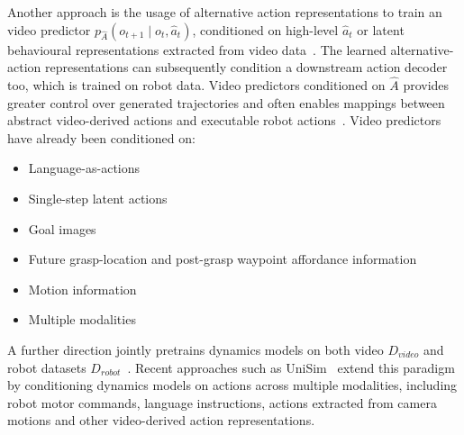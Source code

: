 Another approach is the usage of alternative action representations to train an video predictor $p_{\hat{A}}(o_{t+1} \mid o_t, \hat{a}_t)$, conditioned on high-level $\hat{a}_t$ or latent behavioural representations extracted from video data~\cite{Bruce2024GenieGI, Yang2023LearningIR, Du2023VideoLP, Du2023LearningUP, Rybkin2018LearningWY, Mendonca2023StructuredWM, Yuan2021DMotionRV, Wang2023ManipulateBS}. The learned alternative-action representations can subsequently condition a downstream action decoder too, which is trained on robot data. Video predictors conditioned on $\hat{A}$ provides greater control over generated trajectories and often enables mappings between abstract video-derived actions and executable robot actions~\cite{Rybkin2018LearningWY, Schmidt2023LearningTA}.
Video predictors have already been conditioned on:
\begin{itemize}
    \item Language-as-actions~\cite{Yang2023LearningIR, Du2023VideoLP}
    \item Single-step latent actions~\cite{Rybkin2018LearningWY, Bruce2024GenieGI}
    \item Goal images~\cite{Du2023LearningUP}
    \item Future grasp-location and post-grasp waypoint affordance information~\cite{Mendonca2023StructuredWM}
    \item Motion information~\cite{Yuan2021DMotionRV, Wang2023ManipulateBS}
    \item Multiple modalities~\cite{Yang2023LearningIR}
\end{itemize}

A further direction jointly pretrains dynamics models on both video $D_{video}$ and robot datasets $D_{robot}$~\cite{Yang2023LearningIR}. Recent approaches such as UniSim~\cite{Yang2023LearningIR} extend this paradigm by conditioning dynamics models on actions across multiple modalities, including robot motor commands, language instructions, actions extracted from camera motions and other video-derived action representations.





